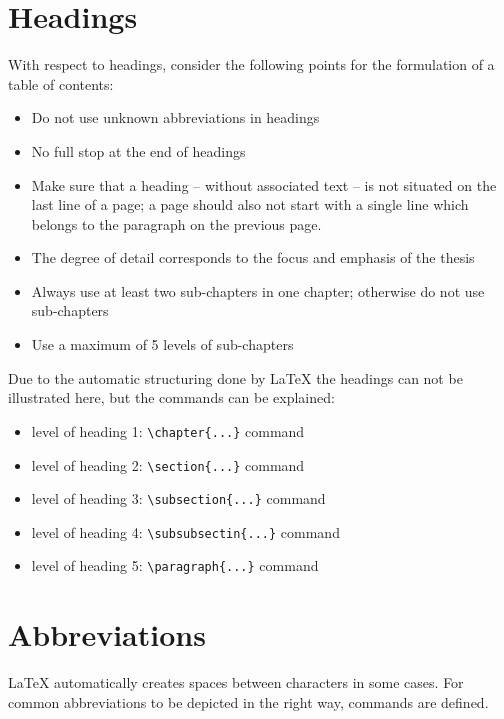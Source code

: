 \section{Headings}
With respect to headings, consider the following points for the formulation of a table of contents:
\begin{itemize}
	\item Do not use unknown abbreviations in headings
	\item No full stop at the end of headings
	\item Make sure that a heading – without associated text – is not situated on the last line of a page; a page should also not start with a single line which belongs to the paragraph on the previous page.
	\item The degree of detail corresponds to the focus and emphasis of the thesis
	\item Always use at least two sub-chapters in one chapter; otherwise do not use sub-chapters
	\item Use a maximum of 5 levels of sub-chapters
\end{itemize}
Due to the automatic structuring done by {\LaTeX} the headings can not be illustrated here, but the commands can be explained:
\begin{itemize}
	\item level of heading 1: \verb|\chapter{...}| command
	\item level of heading 2: \verb|\section{...}| command
	\item level of heading 3: \verb|\subsection{...}| command
	\item level of heading 4: \verb|\subsubsectin{...}| command
	\item level of heading 5: \verb|\paragraph{...}| command
\end{itemize}

\newpage
\section{Abbreviations}
{\LaTeX} automatically creates spaces between characters in some cases. For common abbreviations to be depicted in the right way, commands are defined.

